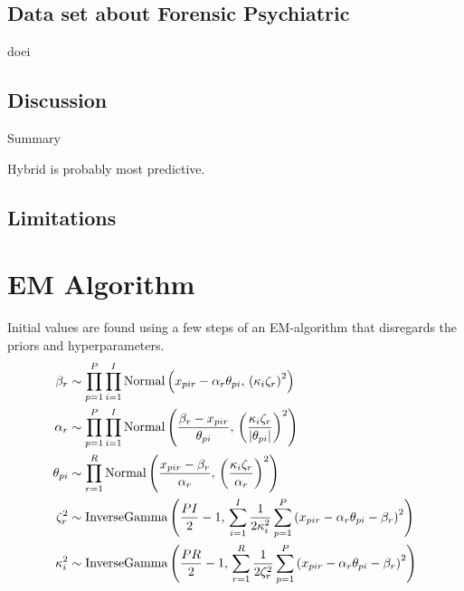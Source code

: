 \documentclass[a4paper,11pt]{article}
\begin{document}
\subsection{Data set about Forensic Psychiatric}
doei
\subsection{Discussion}
Summary

Hybrid is probably most predictive.

\subsection{Limitations}

\printbibliography

\appendix
\section{EM Algorithm}

Initial values are found using a few steps of an EM-algorithm that disregards the priors and hyperparameters.
\begin{align*}
	\RaterShift_\Irater &\sim \prod_{\Ipatient=1}^\Tpatient\prod_{\Iitem=1}^\Titem \dnorm{x_{pir} - \RaterScale_\Irater\ItemTruth_{\Ipatient\Iitem}}{\left(\ItemDifficulty_\Iitem\RaterCompetence_\Irater\right)^2} \\
	\RaterScale_\Irater &\sim \prod_{\Ipatient=1}^\Tpatient\prod_{\Iitem=1}^\Titem 
	\dnorm{\frac{
			\RaterShift_\Irater - x_{pir}
		}{
			\ItemTruth_{\Ipatient\Iitem}
		}}{
		\left(\frac{
			\ItemDifficulty_\Iitem\RaterCompetence_\Irater
		}{
			\left|\ItemTruth_{\Ipatient\Iitem}\right|}\right)^2
		} \\
	\ItemTruth_{\Ipatient\Iitem} &\sim \prod_{\Irater=1}^\Trater
	\dnorm{\frac{
			x_{pir} - \RaterShift_\Irater
		}{
			\RaterScale_\Irater
		}}{
		\left(\frac{
			\ItemDifficulty_\Iitem\RaterCompetence_\Irater
		}{
			\RaterScale_\Irater}\right)^2
	} \\
	\RaterCompetence_\Irater^2 &\sim \dinvgamma{\frac{\Tpatient\Titem}{2}-1}{
		\sum_{\Iitem=1}^\Titem \frac{1}{2\ItemDifficulty_\Iitem^{2}}\sum_{\Ipatient=1}^\Tpatient
		\left(x_{pir} - \RaterScale_\Irater\ItemTruth_{\Ipatient\Iitem} - \RaterShift_\Irater\right)^2
	}\\
	\ItemDifficulty_\Iitem^2 &\sim \dinvgamma{\frac{\Tpatient\Trater}{2}-1}{
		\sum_{\Irater=1}^\Trater \frac{1}{2\RaterCompetence_\Irater^{2}}\sum_{\Ipatient=1}^\Tpatient
		\left(x_{pir} - \RaterScale_\Irater\ItemTruth_{\Ipatient\Iitem} - \RaterShift_\Irater\right)^2
	}
\end{align*}
\end{document}
